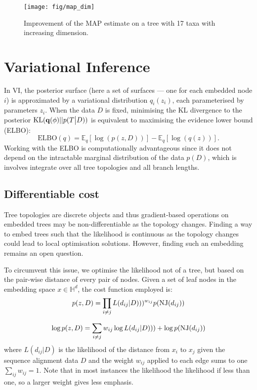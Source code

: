 \documentclass[11pt, twocolumn]{article}
\newcommand{\be}{\begin{equation*}}
\newcommand{\ee}{\end{equation*}}
\begin{document}
\begin{figure}[htbp] \label{fig:map_dim}
\begin{center}
    \texttt{[image: fig/map\_dim]}
\end{center}
\caption{Improvement of the MAP estimate on a tree with 17 taxa with increasing dimension.}
\end{figure}

\section{Variational Inference}
In VI, the posterior surface (here a set of surfaces --- one for each embedded node $i$) is approximated by a variational distribution $q_{i}(z_{i})$, each parameterised by parameters $z_{i}$.
When the data $D$ is fixed, minimising the KL divergence to the posterior $\text{KL}({\bf q}(\phi)||p(T\big|D))$ is equivalent to maximising the evidence lower bound (ELBO):
\be
\text{ELBO}(q) = \mathbb{E}_{q}[\log(p(z,D))] - \mathbb{E}_{q}[\log(q(z))].
\ee
Working with the ELBO is computationally advantageous since it does not depend on the intractable marginal distribution of the data $p(D)$, which is involves integrate over all tree topologies and all branch lengths.

\subsection{Differentiable cost}
Tree topologies are discrete objects and thus gradient-based operations on embedded trees may be non-differentiable as the topology changes.
Finding a way to embed trees such that the likelihood is continuous as the topology changes could lead to local optimisation solutions.
However, finding such an embedding remains an open question.

To circumvent this issue, we optimise the likelihood not of a tree, but based on the pair-wise distance of every pair of nodes.
Given a set of leaf nodes in the embedding space $x \in \mathbb{H}^{d}$, the cost function employed is:
\begin{equation}
p(z, D) = \prod_{i \neq j} L(d_{ij}|D)))^{w_{ij}}  p(\textnormal{NJ}(d_{ij}))
\end{equation}

\begin{equation}
\log p(z, D) = \sum_{i \neq j} w_{ij} \log L(d_{ij}|D))) + \log p(\textnormal{NJ}(d_{ij}))
\end{equation}
\noindent where $L(d_{ij}|D)$ is the likelihood of the distance from $x_{i}$ to $x_{j}$ given the sequence alignment data $D$ and the weight $w_{ij}$ applied to each edge sums to one $\sum_{ij} w_{ij} = 1$.
Note that in most instances the likelihood the likelihood if less than one, so a larger weight gives less emphasis.
\end{document}

